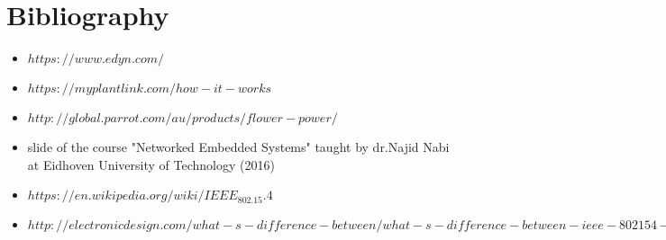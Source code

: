 \documentclass[conference]{IEEEtran}
\begin{document}
\section{Bibliography}
\begin{itemize}
	\item$ https://www.edyn.com/$
	\item $https://myplantlink.com/how-it-works$
	\item$http://global.parrot.com/au/products/flower-power/$
	\item slide of the course "Networked Embedded Systems" taught by dr.Najid Nabi at Eidhoven University of Technology (2016)
	\item $https://en.wikipedia.org/wiki/IEEE_802.15.4$
	\item $http://electronicdesign.com/what-s-difference-between/what-s-difference-between-ieee-802154-and-zigbee-wireless$
	
\end{itemize}

\printbibliography



\end{document}
